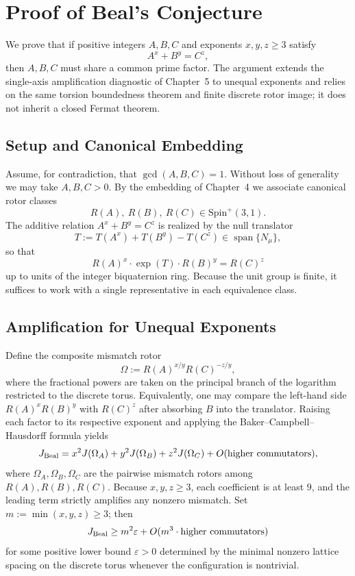 \documentclass[a4paper]{article}
\theoremstyle{definition}
\theoremstyle{remark}
\begin{document}
\section{Proof of Beal's Conjecture}

We prove that if positive integers \( A, B, C \) and exponents \( x, y, z \geq 3 \) satisfy
\[
A^x + B^y = C^z,
\]
then \( A, B, C \) must share a common prime factor. The argument extends the single-axis amplification diagnostic of Chapter~5 to unequal exponents and relies on the same torsion boundedness theorem and finite discrete rotor image; it does not inherit a closed Fermat theorem.

\subsection{Setup and Canonical Embedding}

Assume, for contradiction, that \( \gcd(A,B,C) = 1 \). Without loss of generality we may take \( A, B, C > 0 \). By the embedding of Chapter~4 we associate canonical rotor classes
\[
R(A),\ R(B),\ R(C) \in \mathrm{Spin}^+(3,1).
\]
The additive relation \( A^x + B^y = C^z \) is realized by the null translator
\[
T := T(A^x) + T(B^y) - T(C^z) \in \operatorname{span}\{N_\mu\},
\]
so that
\[
R(A)^x \cdot \exp(T) \cdot R(B)^y = R(C)^z
\]
up to units of the integer biquaternion ring. Because the unit group is finite, it suffices to work with a single representative in each equivalence class.

\subsection{Amplification for Unequal Exponents}

Define the composite mismatch rotor
\[
\Omega := R(A)^{x/y} R(C)^{-z/y},
\]
where the fractional powers are taken on the principal branch of the logarithm restricted to the discrete torus. Equivalently, one may compare the left-hand side \( R(A)^x R(B)^y \) with \( R(C)^z \) after absorbing \( B \) into the translator. Raising each factor to its respective exponent and applying the Baker--Campbell--Hausdorff formula yields
\[
J_{\rm Beal} = x^2 J(\Omega_A) + y^2 J(\Omega_B) + z^2 J(\Omega_C) + O(\text{higher commutators}),
\]
where \( \Omega_A, \Omega_B, \Omega_C \) are the pairwise mismatch rotors among \( R(A), R(B), R(C) \). Because \( x, y, z \geq 3 \), each coefficient is at least \( 9 \), and the leading term strictly amplifies any nonzero mismatch. Set \( m := \min(x,y,z) \geq 3 \); then
\[
J_{\rm Beal} \geq m^2 \varepsilon + O(m^3 \cdot \text{higher commutators})
\]
for some positive lower bound \( \varepsilon > 0 \) determined by the minimal nonzero lattice spacing on the discrete torus whenever the configuration is nontrivial.
\end{document}
